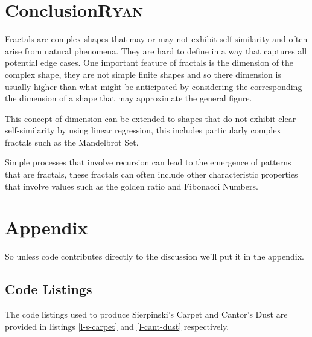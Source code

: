 \documentclass[a4paper,11pt,twoside]{article}
\begin{document}
\section{Conclusion\hfill{}\textsc{Ryan}}
\label{sec:org1751e98}
Fractals are complex shapes that may or may not exhibit self similarity and often arise from natural phenomena. They are hard to define in a way that captures all potential edge cases. One important feature of fractals is the dimension of the complex shape, they are not simple finite shapes and so there dimension is usually higher than what might be anticipated by considering the corresponding the dimension of a shape that may approximate the general figure.

This concept of dimension can be extended to shapes that do not exhibit clear self-similarity by using linear regression, this includes particularly complex fractals such as the Mandelbrot Set.

Simple processes that involve recursion can lead to the emergence of patterns that are fractals, these fractals can often include other characteristic properties that involve values such as the golden ratio and Fibonacci Numbers.

 \appendix 
\section{Appendix}
\label{appendix}
So unless code contributes directly to the discussion we'll put it in the appendix.
\subsection{Code Listings}
\label{sec:org6ad964e}
The code listings used to produce Sierpinski's Carpet and Cantor's Dust are provided in listings \ref{l-s-carpet} and \ref{l-cant-dust} respectively.
\end{document}
